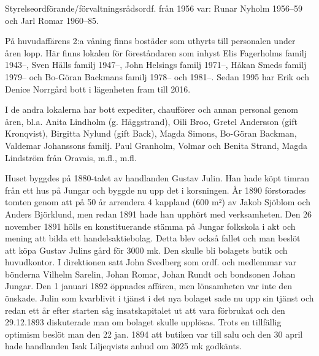 Styrelseordförande/förvaltningsrådsordf. från 1956 var: Runar Nyholm 1956--59 och Jarl Romar 1960--85.


På huvudaffärens 2:a våning finns bostäder som uthyrts till personalen under åren lopp. Här finns lokalen för föreståndaren som inhyst Elis Fagerholms familj 1943--, Sven Hälls familj 1947--, John Helsings familj 1971--, Håkan Smeds familj 1979-- och Bo-Göran Backmans familj 1978-- och 1981--. Sedan 1995 har Erik och Denice Norrgård bott i lägenheten fram till 2016.

I de andra lokalerna har bott expediter, chaufförer och annan personal genom åren, bl.a. Anita Lindholm (g. Häggstrand), Oili Broo, Gretel Andersson (gift Kronqvist), Birgitta Nylund (gift Back), Magda Simons, Bo-Göran Backman, Valdemar Johanssons familj. Paul Granholm, Volmar och Benita Strand, Magda Lindström från Oravais, m.fl., m.fl.






Huset byggdes på 1880-talet av handlanden Gustav Julin. Han hade köpt timran från ett hus på Jungar och byggde nu upp det i korsningen. År 1890 förstorades tomten genom att på 50 år arrendera 4 kappland (600 m²) av Jakob Sjöblom och Anders Björklund, men redan 1891 hade han upphört med verksamheten. Den 26 november 1891 hölls en konstituerande stämma på Jungar folkskola i akt och mening att bilda ett handelsaktiebolag. Detta blev också fallet och man beslöt att köpa Gustav Julins gård för 3000 mk. Den skulle bli bolagets butik och huvudkontor. I direktionen satt John Svedberg som ordf. och medlemmar var bönderna Vilhelm Sarelin, Johan Romar, Johan Rundt och bondsonen Johan Jungar. Den 1 januari 1892 öppnades affären, men lönsamheten var inte den önskade. Julin som kvarblivit i tjänst i det nya bolaget sade nu upp sin tjänst och redan ett år efter starten såg insatskapitalet ut att vara förbrukat och den 29.12.1893 diskuterade man om bolaget skulle upplösas. Trots en tillfällig optimism beslöt man den 22 jan. 1894 att butiken var till salu och den 30 april hade handlanden Isak Liljeqvists anbud om 3025 mk godkänts.

